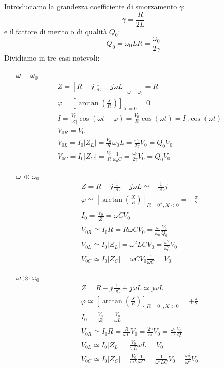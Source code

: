 Introduciamo la grandezza coefficiente di smorzamento $\gamma$:
\begin{equation}
\gamma = \frac{R}{2L}
\end{equation}
e il fattore di merito o di qualità $Q_0$:
\begin{equation}
Q_0 = {\omega_0L}{R}=\frac{\omega_0}{2\gamma}
\end{equation}
Dividiamo in tre casi notevoli:
\begin{itemize}
\item[$\omega=\omega_0$]
\begin{gather}
Z = \left[R-j\frac{1}{\omega C}+j\omega L\right]_{\omega=\omega_0}=R\\
\varphi = \left[\arctan\left(\frac{X}{R}\right)\right]_{X=0}=0\\
I = \frac{V_0}{|Z|}\cos\left(\omega t-\varphi\right)=\frac{V_0}{R}\cos(\omega t)=I_0\cos(\omega t)\\
V_{0R}=V_0\\
V_{0L}=I_0|Z_L|=\frac{V_0}{R}\omega_0 L=\frac{\omega_0}{2\gamma}V_0=Q_0V_0\\
V_{0C}=I_0|Z_C|=\frac{V_0}{R}\frac{1}{\omega_0 C}=\frac{\omega_0}{2\gamma}V_0=Q_0V_0
\end{gather}
\item[$\omega\ll\omega_0$]
\begin{gather}
Z=R-j\frac{1}{\omega C}+j\omega L\simeq -\frac{1}{\omega C}j\\
\varphi \simeq \left[\arctan\left(\frac{X}{R}\right)\right]_{R=0^+,X<0}=-\frac{\pi}{2}\\
I_0 = \frac{V_0}{|Z|}=\omega C V_0\\
V_{0R}\simeq I_0R=R\omega C V_0=\frac{\omega}{\omega_0}\frac{V_0}{Q_0}\\
V_{0L}\simeq I_0|Z_L|=\omega^2LCV_0=\frac{\omega^2}{\omega_0^2}V_0\\
V_{0C}\simeq I_0|Z_C|=\omega C V_0\frac{1}{\omega C}=V_0
\end{gather}
\item[$\omega\gg\omega_0$]
\begin{gather}
Z=R-j\frac{1}{\omega C}+j\omega L\simeq j\omega L\\
\varphi \simeq \left[\arctan\left(\frac{X}{R}\right)\right]_{R=0^+,X>0}=+\frac{\pi}{2}\\
I_0 = \frac{V_0}{|Z|}= \frac{V_0}{\omega L}\\
V_{0R}\simeq I_0R=\frac{R}{\omega L}V_0=\frac{2\gamma}{\omega}V_0=\frac{\omega_0}{\omega}\frac{V_0}{Q}\\
V_{0L}\simeq I_0|Z_L|=\frac{V_0}{\omega L}\omega L=V_0\\
V_{0C}\simeq I_0|Z_C|=\frac{V_0}{\omega L}\frac{1}{\omega C}=\frac{1}{\omega^2 LC}V_0=\frac{\omega_0^2}{\omega^2}V_0
\end{gather}
\end{itemize}
